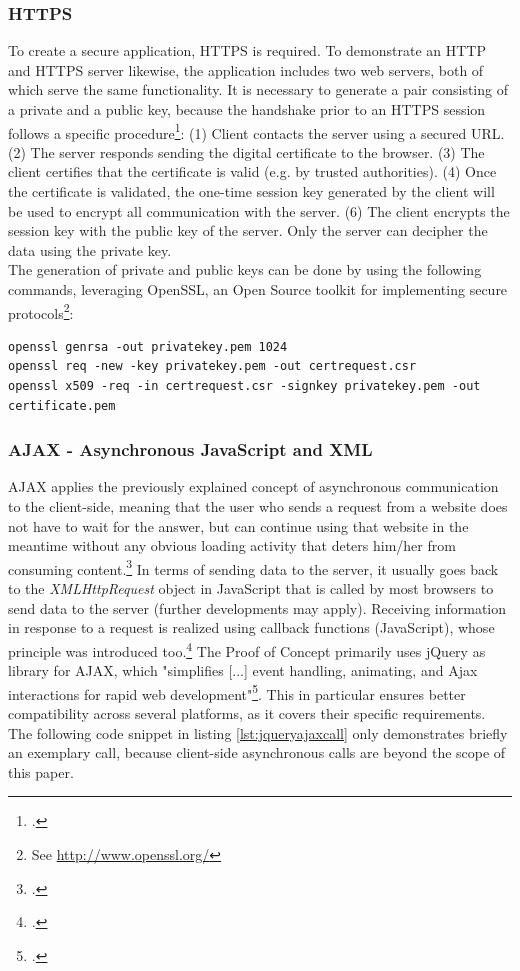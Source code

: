 \subsubsection{HTTPS}
To create a secure application, HTTPS is required. To demonstrate an HTTP and
HTTPS server likewise, the application includes two web servers, both of which
serve the same functionality. It is necessary to generate a pair consisting of a
private and a public key, because the handshake prior to an HTTPS session
follows a specific procedure\footcite[Cf.][]{Nemati_2011}:
 (1) Client contacts the server using a secured URL.
 (2) The server responds sending the digital certificate to the browser.
 (3) The client certifies that the certificate is valid (e.g. by trusted
 authorities).
 (4) Once the certificate is validated, the one-time session key generated by
 the client will be used to encrypt all communication with the server.
 (6) The client encrypts the session key with the public key of the server. Only
 the server can decipher the data using the private key.\\
The generation of private and public keys can be done by using the following
commands, leveraging OpenSSL, an Open Source toolkit for implementing secure
protocols\footnote{See \url{ http://www.openssl.org/}}:\\

\begin{lstlisting}[caption={Generating a new pair of public/private keys}]
openssl genrsa -out privatekey.pem 1024
openssl req -new -key privatekey.pem -out certrequest.csr 
openssl x509 -req -in certrequest.csr -signkey privatekey.pem -out certificate.pem
\end{lstlisting}

\subsubsection{AJAX - Asynchronous JavaScript and XML}
AJAX applies the previously explained concept of asynchronous communication to
the client-side, meaning that the user who sends a request from a website does
not have to wait for the answer, but can continue using that website in the
meantime without any obvious loading activity that deters him/her from consuming
content.\footcite[Cf.][46]{riordan2008head} In terms of sending data to the
server, it usually goes back to the \textit{XMLHttpRequest} object in JavaScript that is
called by most browsers to send data to the server (further developments may
apply). Receiving information in response to a request is realized using
callback functions (JavaScript), whose principle was introduced
too.\footcite[Cf.][21]{riordan2008head} The Proof of Concept primarily uses
jQuery as library for AJAX, which "simplifies [...] event handling, animating,
and Ajax interactions for rapid web development"\footcite[Cf.][]{jquery2013}.
This in particular ensures better compatibility across several platforms, as it
covers their specific requirements. The following code snippet in listing
\ref{lst:jqueryajaxcall} only demonstrates briefly an exemplary call, because
client-side asynchronous calls are beyond the scope of this paper.

